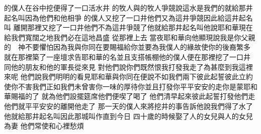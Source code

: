 的僕人在谷中挖\chientien 便得了一口活水井\chuan 
{}的牧人與的牧人爭競\chientien 說\chientien 這水是我們的\yuentien\linebreak{}就給那井起名叫\chientien 因為他們和他相爭\chuan{}
的僕人又挖了一口井\chientien 他們又為這井爭競\chientien 因此給這井起名叫\chuan{}
離開那裡\chientien 又挖了一口井\chientien 他們不為這井爭競了\chientien 他就給那井起名叫\yuentien{}他說\chientien 耶和華現在給我們寬闊之地\chientien 我們必在這地昌盛\chuan\Chuan
{}從那裡上去\chuan 
{}當夜耶和華向他顯現\chientien 說\chientien 我是你父親的　神\chientien 不要懼怕\chientien 因為我與你同在\chientien 要賜福給你\chientien 並要為我僕人的緣故\chientien 使你的後裔繁多\chuan 
{}就在那裡築了一座壇\chientien 求告耶和華的名\chientien 並且支搭帳棚\yuentien 他的僕人便在那裡挖了一口井\chuan\Chuan
{}\chientien 同他的朋友\chientien 和他的軍長\chientien 從來見\chuan 
{}對他們說\chientien 你們既然恨我\chientien 打發我走了\chientien 為甚麼到我這裡來呢\chuan 
{}他們說\chientien 我們明明的看見耶和華與你同在\chientien 便說\chientien 不如我們兩下彼此起誓\chientien 彼此立約\chuan 
{}使你不害我們\chientien 正如我們未曾害你\chientien 一味的厚待你\chientien 並且打發你平平安安的走\yuentien 你是蒙耶和華賜福的了\chuan 
{}就為他們設擺筵席\chientien 他們便喫了喝了\chuan 
{}他們清早起來彼此起誓\yuentien{}打發他們走\chientien 他們就平平安安的離開他走了\chuan 
{}那一天的僕人來\chientien 將挖井的事告訴他\chientien 說\chientien 我們得了水了\chuan 
{}他就給那井起名叫\yuentien 因此那城叫作\chientien 直到今日\chuan\Chuan
{}四十歲的時候\chientien 娶了人的女兒\chientien 與人的女兒為妻\yuentien 
{}他們常使和心裡愁煩\chuan 

